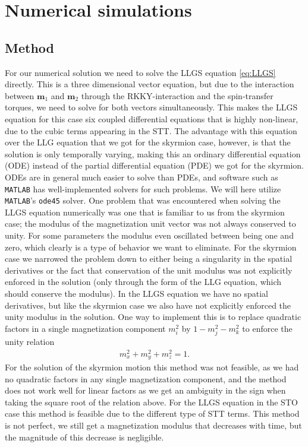 \section{Numerical simulations}
\subsection{Method}
For our numerical solution we need to solve the LLGS equation \eqref{eq:LLGS} directly. This is a three dimensional vector equation, but due to the interaction between $\mathbold{m}_1$ and $\mathbold{m}_2$ through the RKKY-interaction and the spin-transfer torques, we need to solve for both vectors simultaneously. This makes the LLGS equation for this case six coupled differential equations that is highly non-linear, due to the cubic terms appearing in the STT. The advantage with this equation over the LLG equation that we got for the skyrmion case, however, is that the solution is only temporally varying, making this an ordinary differential equation (ODE) instead of the partial differential equation (PDE) we got for the skyrmion. ODEs are in general much easier to solve than PDEs, and software such as \texttt{MATLAB} has well-implemented solvers for such problems. We will here utilize \texttt{MATLAB}'s \texttt{ode45} solver. One problem that was encountered when solving the LLGS equation numerically was one that is familiar to us from the skyrmion case; the modulus of the magnetization unit vector was not always conserved to unity. For some parameters the modulus even oscillated between being one and zero, which clearly is a type of behavior we want to eliminate. For the skyrmion case we narrowed the problem down to either being a singularity in the spatial derivatives or the fact that conservation of the unit modulus was not explicitly enforced in the solution (only through the form of the LLG equation, which should conserve the modulus). In the LLGS equation we have no spatial derivatives, but like the skyrmion case we also have not explicitly enforced the unity modulus in the solution. One way to implement this is to replace quadratic factors in a single magnetization component $m_i^2$ by $1-m_j^2-m_k^2$ to enforce the unity relation
\begin{align}
    m_x^2+m_y^2+m_z^2=1.
\end{align}
For the solution of the skyrmion motion this method was not feasible, as we had no quadratic factors in any single magnetization component, and the method does not work well for linear factors as we get an ambiguity in the sign when taking the square root of the relation above. For the LLGS equation in the STO case this method is feasible due to the different type of STT terms. This method is not perfect, we still get a magnetization modulus that decreases with time, but the magnitude of this decrease is negligible.


